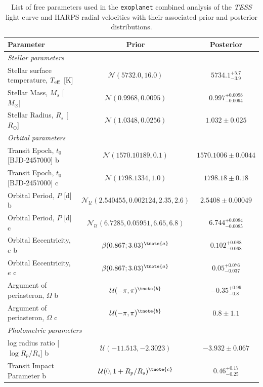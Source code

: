 \documentclass[fleqn,usenatbib]{mnras}
\newcommand{\tess}{{\it TESS}}
\newcommand{\harps}{{HARPS}}
\newcommand{\teff}{$T_{\rm eff}$}
\begin{document}
\centering
\begin{table}
\caption{List of free parameters used in the \texttt{exoplanet} combined analysis of the \tess{} light curve and \harps{} radial velocities with their associated prior and posterior distributions.}
\label{tab:planetparlong}
\begin{center}
\begin{tabular}{lcc}
\hline
\hline
Parameter & Prior & Posterior\\
\hline
\hline
\multicolumn{3}{l}{\it Stellar parameters}\\
Stellar surface temperature, \teff{} [K] &  $\mathcal{N}(5732.0,16.0)$  &   $ 5734.1^{+5.7}_{-3.9} $ \\
Stellar Mass, $M_s$ [$M_{\odot}$] &  $\mathcal{N}(0.9968,0.0095)$  &   $ 0.997^{+0.0098}_{-0.0094} $ \\
Stellar Radius, $R_s$ [$R_{\odot}$] &  $\mathcal{N}(1.0348,0.0256)$  &   $ 1.032 \pm 0.025 $ \\
\hline
\multicolumn{3}{l}{\it Orbital parameters}\\
Transit Epoch, $t_0$ [BJD-2457000] b &  $\mathcal{N}(1570.10189,0.1)$  &   $ 1570.1006 \pm 0.0044 $ \\
Transit Epoch, $t_0$ [BJD-2457000] c &  $\mathcal{N}(1798.1334,1.0)$  &   $ 1798.18 \pm 0.18 $ \\
Orbital Period, $P$ [d] b &  $\mathcal{N}_{\mathcal{U}}(2.540455,0.002124,2.35,2.6)$  &   $ 2.5408 \pm 0.00049 $ \\
Orbital Period, $P$ [d] c &  $\mathcal{N}_{\mathcal{U}}(6.7285,0.05951,6.65,6.8)$  &   $ 6.744^{+0.0084}_{-0.0085} $ \\
Orbital Eccentricity, $e$ b &  $\beta(0.867;3.03)^{\tnote{a}}$  &   $ 0.102^{+0.088}_{-0.068} $ \\
Orbital Eccentricity, $e$ c &  $\beta(0.867;3.03)^{\tnote{a}}$  &   $ 0.05^{+0.076}_{-0.037} $ \\
Argument of periasteron, $\Omega$ b &  $\mathcal{U}(-\pi,\pi)^{\tnote{b}}$  &   $ -0.35^{+0.99}_{-0.8} $ \\
Argument of periasteron, $\Omega$ c &  $\mathcal{U}(-\pi,\pi)^{\tnote{b}}$  &   $ 0.8 \pm 1.1 $ \\
\hline
\multicolumn{3}{l}{\it Photometric parameters}\\
log radius ratio [$\log{R_p/R_s}$] b &  $\mathcal{U}(-11.513,-2.3023)$  &   $ -3.932 \pm 0.067 $ \\
Transit Impact Parameter b & $\mathcal{U}(0,1+R_p/R_s)^{\tnote{c}}$  &   $ 0.46^{+0.17}_{-0.25} $ \\

\end{tabular}
\end{center}
\end{table}
\end{document}
